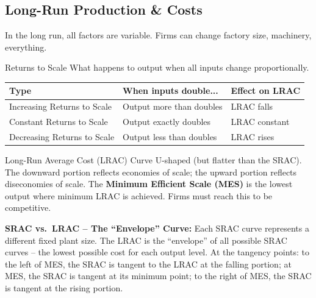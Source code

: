 \documentclass[11pt, a4paper, twoside]{book}
\begin{document}
\subsection{Long-Run Production \& Costs}

In the long run, all factors are variable. Firms can change factory size, machinery, everything.

\begin{keyterm}{Returns to Scale}
What happens to output when all inputs change proportionally.
\end{keyterm}

\begin{example}
\begin{tabular}{@{}lll@{}}
\textbf{Type} & \textbf{When inputs double...} & \textbf{Effect on LRAC} \\
\midrule
Increasing Returns to Scale & Output more than doubles & LRAC falls \\
Constant Returns to Scale & Output exactly doubles & LRAC constant \\
Decreasing Returns to Scale & Output less than doubles & LRAC rises \\
\end{tabular}
\end{example}

\begin{keyterm}{Long-Run Average Cost (LRAC) Curve}
U-shaped (but flatter than the SRAC). The downward portion reflects economies of scale; the upward portion reflects diseconomies of scale. The \textbf{Minimum Efficient Scale (MES)} is the lowest output where minimum LRAC is achieved. Firms must reach this to be competitive.
\end{keyterm}

\textbf{SRAC vs.\ LRAC -- The ``Envelope'' Curve:} Each SRAC curve represents a different fixed plant size. The LRAC is the ``envelope'' of all possible SRAC curves -- the lowest possible cost for each output level. At the tangency points: to the left of MES, the SRAC is tangent to the LRAC at the falling portion; at MES, the SRAC is tangent at its minimum point; to the right of MES, the SRAC is tangent at the rising portion.
\end{document}
